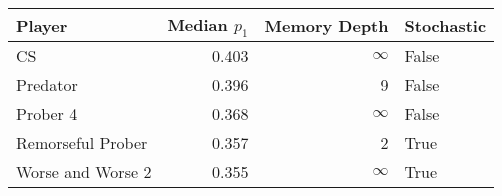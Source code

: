 \begin{tabular}{lrrl}
\toprule
            Player &  Median $p_1$ &  Memory Depth & Stochastic \\
\midrule
                CS &         0.403 &            \(\infty\) &      False \\
          Predator &         0.396 &             9 &      False \\
          Prober 4 &         0.368 &            \(\infty\) &      False \\
 Remorseful Prober &         0.357 &             2 &       True \\
 Worse and Worse 2 &         0.355 &            \(\infty\) &       True \\
\bottomrule
\end{tabular}
